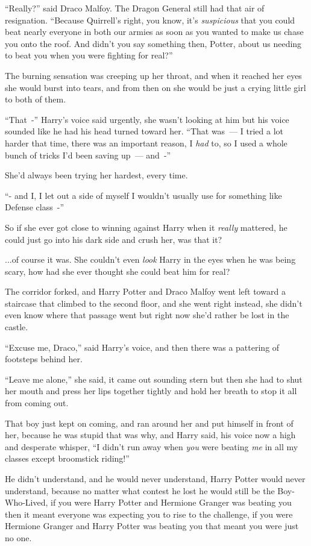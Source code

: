 ``Really?'' said Draco Malfoy. The Dragon General still had that air of resignation. ``Because Quirrell's right, you know, it's \emph{suspicious} that you could beat nearly everyone in both our armies as soon as you wanted to make us chase you onto the roof. And didn't you say something then, Potter, about us needing to beat you when you were fighting for real?''

The burning sensation was creeping up her throat, and when it reached her eyes she would burst into tears, and from then on she would be just a crying little girl to both of them.

``That~-'' Harry's voice said urgently, she wasn't looking at him but his voice sounded like he had his head turned toward her. ``That was~--- I tried a lot harder that time, there was an important reason, I \emph{had} to, so I used a whole bunch of tricks I'd been saving up~--- and~-''

She'd always been trying her hardest, every time.

``- and I, I let out a side of myself I wouldn't usually use for something like Defense class~-''

So if she ever got close to winning against Harry when it \emph{really} mattered, he could just go into his dark side and crush her, was that it?

...of course it was. She couldn't even \emph{look} Harry in the eyes when he was being scary, how had she ever thought she could beat him for real?

The corridor forked, and Harry Potter and Draco Malfoy went left toward a staircase that climbed to the second floor, and she went right instead, she didn't even know where that passage went but right now she'd rather be lost in the castle.

``Excuse me, Draco,'' said Harry's voice, and then there was a pattering of footsteps behind her.

``Leave me alone,'' she said, it came out sounding stern but then she had to shut her mouth and press her lips together tightly and hold her breath to stop it all from coming out.

That boy just kept on coming, and ran around her and put himself in front of her, because he was stupid that was why, and Harry said, his voice now a high and desperate whisper, ``I didn't run away when \emph{you} were beating \emph{me} in all my classes except broomstick riding!''

He didn't understand, and he would never understand, Harry Potter would never understand, because no matter what contest he lost he would still be the Boy-Who-Lived, if you were Harry Potter and Hermione Granger was beating you then it meant everyone was expecting you to rise to the challenge, if you were Hermione Granger and Harry Potter was beating you that meant you were just no one.

